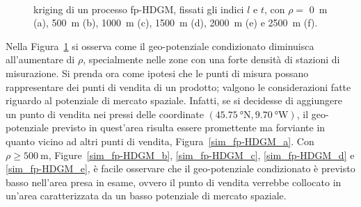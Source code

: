 \begin{figure}[htbp]
	\
	\caption[Kriging di un processo fp-HDGM al variare di $\rho$]{kriging di un processo fp-HDGM, fissati gli indici $l$ e $t$, con $\rho=$ \SI{0}{\meter} (a), \SI{500}{\meter} (b), \SI{1000}{\meter} (c), \SI{1500}{\meter} (d), \SI{2000}{\meter} (e) e \SI{2500}{\meter} (f).}
	\label{sim_fp-HDGM}
\end{figure}
Nella Figura~\ref{sim_fp-HDGM} si osserva come il geo-potenziale condizionato diminuisca all'aumentare di $\rho$, specialmente nelle zone con una forte densità di stazioni di misurazione. Si prenda ora come ipotesi che le punti di misura possano rappresentare dei punti di vendita di un prodotto; valgono le considerazioni fatte riguardo al potenziale di mercato spaziale. Infatti, se si decidesse di aggiungere un punto di vendita nei pressi delle coordinate $(\SI{45.75}{\degree} \text{N}, \SI{9.70}{\degree} \text{W})$, il geo-potenziale previsto in quest'area risulta essere promettente ma forviante in quanto vicino ad altri punti di vendita, Figura~\ref{sim_fp-HDGM_a}. Con $\rho \geq \SI{500}{\meter}$, Figure~\ref{sim_fp-HDGM_b}, \ref{sim_fp-HDGM_c},  \ref{sim_fp-HDGM_d} e \ref{sim_fp-HDGM_e}, è facile osservare che il geo-potenziale condizionato è previsto basso nell'area presa in esame, ovvero il punto di vendita verrebbe collocato in un'area caratterizzata da un basso potenziale di mercato spaziale.